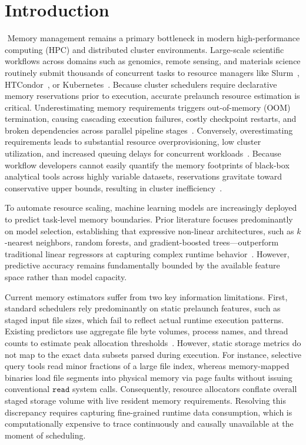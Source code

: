 \section{Introduction}
$\label{sec:Introduction}$
Memory management remains a primary bottleneck in modern high-performance computing (HPC) and distributed cluster environments. Large-scale scientific workflows across domains such as genomics, remote sensing, and materials science routinely submit thousands of concurrent tasks to resource managers like Slurm~\cite{yoo2003slurm}, HTCondor~\cite{thain2005htcondor}, or Kubernetes~\cite{burns2016borg}. Because cluster schedulers require declarative memory reservations prior to execution, accurate prelaunch resource estimation is critical. Underestimating memory requirements triggers out-of-memory (OOM) termination, causing cascading execution failures, costly checkpoint restarts, and broken dependencies across parallel pipeline stages~\cite{witt2019feedback,lehmann2024ponder}. Conversely, overestimating requirements leads to substantial resource overprovisioning, low cluster utilization, and increased queuing delays for concurrent workloads~\cite{bader2024sizey,witt2019feedback}. Because workflow developers cannot easily quantify the memory footprints of black-box analytical tools across highly variable datasets, reservations gravitate toward conservative upper bounds, resulting in cluster inefficiency~\cite{bader2024sizey,lehmann2024ponder}.

To automate resource scaling, machine learning models are increasingly deployed to predict task-level memory boundaries. Prior literature focuses predominantly on model selection, establishing that expressive non-linear architectures, such as $k$-nearest neighbors, random forests, and gradient-boosted trees—outperform traditional linear regressors at capturing complex runtime behavior~\cite{rodrigues2016helping,bader2024sizey}. However, predictive accuracy remains fundamentally bounded by the available feature space rather than model capacity. 


Current memory estimators suffer from two key information limitations.
First, standard schedulers rely predominantly on static prelaunch features, such as staged input file sizes, which fail to reflect actual runtime execution patterns. Existing predictors use aggregate file byte volumes, process names, and thread counts to estimate peak allocation thresholds~\cite{witt2019feedback,tovar2018jobsizing,bader2024sizey,lehmann2024ponder}. However, static storage metrics do not map to the exact data subsets parsed during execution. For instance, selective query tools read minor fractions of a large file index, whereas memory-mapped binaries load file segments into physical memory via page faults without issuing conventional \(\texttt{read}\) system calls. Consequently, resource allocators conflate overall staged storage volume with live resident memory requirements. Resolving this discrepancy requires capturing fine-grained runtime data consumption, which is computationally expensive to trace continuously and causally unavailable at the moment of scheduling.

